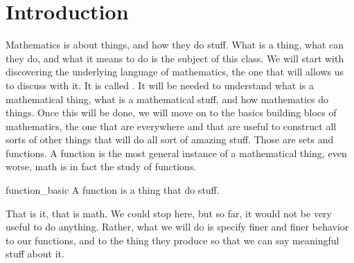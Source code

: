 \section{Introduction}

Mathematics is about things, and how they do stuff. What is a thing, what can they do, and what it means to do is the subject of this class. We will start with discovering the underlying language of mathematics, the one that will allows us to discuss with it. It is called . It will be needed to understand what is a mathematical thing, what is a mathematical stuff, and how mathematics do things. Once this will be done, we will move on to the basics building blocs of mathematics, the one that are everywhere and that are useful to construct all sorts of other things that will do all sort of amazing stuff. Those are sets and functions. A function is the most general instance of a mathematical thing, even worse, math is in fact the study of functions. 

\begin{cdef}{}{function_basic}
    A function is a thing that do stuff.
\end{cdef}

That is it, that is math. We could stop here, but so far, it would not be very useful to do anything. Rather, what we will do is specify finer and finer behavior to our functions, and to the thing they produce so that we can say meaningful stuff about it.
